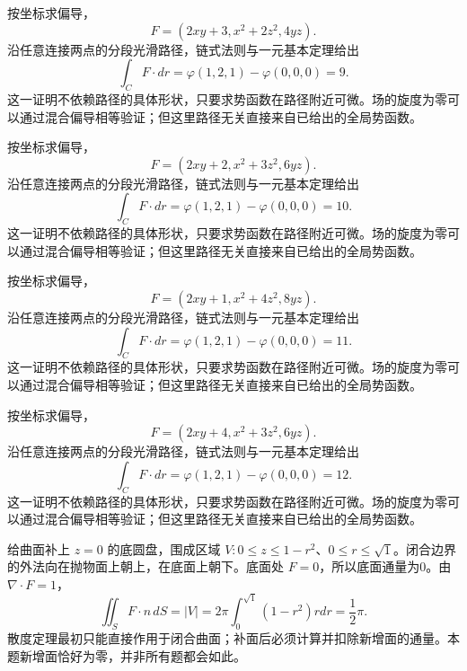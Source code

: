 \documentclass[UTF8,12pt,a4paper,fontset=fandol]{ctexart}
\begin{document}
\begin{solve}\label{ans:c44q15}
按坐标求偏导，
\[
F=(2xy+3,x^2+2z^2,4yz).
\]
沿任意连接两点的分段光滑路径，链式法则与一元基本定理给出
\[
\int_CF\cdot dr=\varphi(1,2,1)-\varphi(0,0,0)=9.
\]
这一证明不依赖路径的具体形状，只要求势函数在路径附近可微。场的旋度为零可以通过混合偏导相等验证；但这里路径无关直接来自已给出的全局势函数。
\end{solve}

\begin{solve}\label{ans:c44q16}
按坐标求偏导，
\[
F=(2xy+2,x^2+3z^2,6yz).
\]
沿任意连接两点的分段光滑路径，链式法则与一元基本定理给出
\[
\int_CF\cdot dr=\varphi(1,2,1)-\varphi(0,0,0)=10.
\]
这一证明不依赖路径的具体形状，只要求势函数在路径附近可微。场的旋度为零可以通过混合偏导相等验证；但这里路径无关直接来自已给出的全局势函数。
\end{solve}

\begin{solve}\label{ans:c44q17}
按坐标求偏导，
\[
F=(2xy+1,x^2+4z^2,8yz).
\]
沿任意连接两点的分段光滑路径，链式法则与一元基本定理给出
\[
\int_CF\cdot dr=\varphi(1,2,1)-\varphi(0,0,0)=11.
\]
这一证明不依赖路径的具体形状，只要求势函数在路径附近可微。场的旋度为零可以通过混合偏导相等验证；但这里路径无关直接来自已给出的全局势函数。
\end{solve}

\begin{solve}\label{ans:c44q18}
按坐标求偏导，
\[
F=(2xy+4,x^2+3z^2,6yz).
\]
沿任意连接两点的分段光滑路径，链式法则与一元基本定理给出
\[
\int_CF\cdot dr=\varphi(1,2,1)-\varphi(0,0,0)=12.
\]
这一证明不依赖路径的具体形状，只要求势函数在路径附近可微。场的旋度为零可以通过混合偏导相等验证；但这里路径无关直接来自已给出的全局势函数。
\end{solve}

\begin{solve}\label{ans:c44q19}
给曲面补上 $z=0$ 的底圆盘，围成区域 $V:0\le z\le 1-r^2$、$0\le r\le\sqrt{1}$。闭合边界的外法向在抛物面上朝上，在底面上朝下。底面处 $F=0$，所以底面通量为0。由 $\nabla\cdot F=1$，
\[
\iint_SF\cdot n\,dS=|V|=2\pi\int_0^{\sqrt{1}}(1-r^2)rdr=\frac{1}{2}\pi.
\]
散度定理最初只能直接作用于闭合曲面；补面后必须计算并扣除新增面的通量。本题新增面恰好为零，并非所有题都会如此。
\end{solve}
\end{document}
